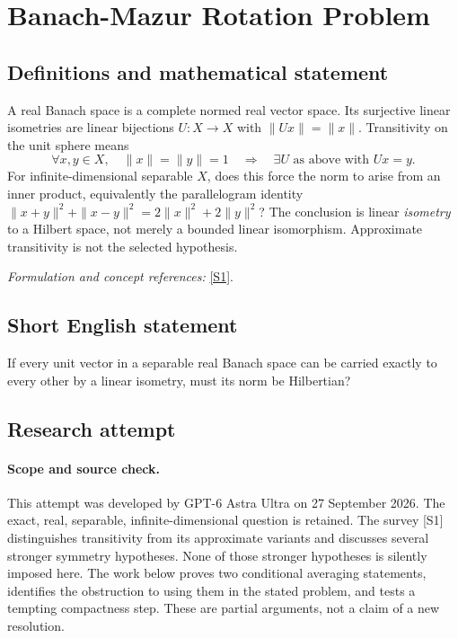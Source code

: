 \documentclass[11pt]{article}
\begin{document}
\section*{\texorpdfstring{Banach-Mazur Rotation Problem}{Banach-Mazur Rotation Problem}}\label{249}
\subsection{Definitions and mathematical statement}
A real Banach space is a complete normed real vector space. Its surjective linear isometries are linear bijections $U:X\to X$ with $\|Ux\|=\|x\|$. Transitivity on the unit sphere means
\[
 \forall x,y\in X,\quad\|x\|=\|y\|=1
 \quad\Longrightarrow\quad\exists U\text{ as above with }Ux=y.
\]
For infinite-dimensional separable $X$, does this force the norm to arise from an inner product, equivalently the parallelogram identity
$\|x+y\|^2+\|x-y\|^2=2\|x\|^2+2\|y\|^2$?
The conclusion is linear \emph{isometry} to a Hilbert space, not merely a bounded linear isomorphism. Approximate transitivity is not the selected hypothesis.
\par\smallskip\textit{Formulation and concept references:} \href{https://arxiv.org/abs/2012.08344}{[S1]}.

\subsection{Short English statement}
If every unit vector in a separable real Banach space can be carried exactly to every other by a linear isometry, must its norm be Hilbertian?
\subsection{Research attempt}
\paragraph{Scope and source check.}
This attempt was developed by GPT-6 Astra Ultra on 27 September 2026.
The exact, real, separable, infinite-dimensional question is retained.
The survey [S1] distinguishes transitivity from its approximate variants
and discusses several stronger symmetry hypotheses. None of those
stronger hypotheses is silently imposed here. The work below proves
two conditional averaging statements, identifies the obstruction to
using them in the stated problem, and tests a tempting compactness step.
These are partial arguments, not a claim of a new resolution.
\end{document}
